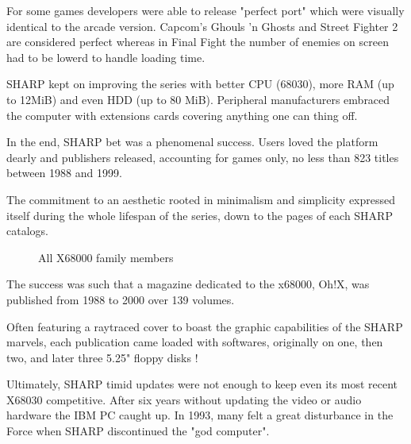  For some games developers were able to release "perfect port" which were visually identical to the arcade version. Capcom's Ghouls 'n Ghosts and Street Fighter 2 are considered perfect whereas in Final Fight the number of enemies on screen had to be lowerd to handle loading time.

 SHARP kept on improving the series with better CPU (68030), more RAM (up to 12MiB) and even HDD (up to 80 MiB). Peripheral manufacturers embraced the computer with extensions cards covering anything one can thing off. 

 In the end, SHARP bet was a phenomenal success. Users loved the platform dearly and publishers released, accounting for games only, no less than 823 titles between 1988 and 1999.



The commitment to an aesthetic rooted in minimalism and simplicity expressed itself during the whole lifespan of the series, down to the pages of each SHARP catalogs. 


 \begin{figure}[H]
\caption*{All X68000 family members}
\end{figure}

\begin{trivia}
The success was such that a magazine dedicated to the x68000, Oh!X, was published from 1988 to 2000 over 139 volumes. 


\begin{minipage}[t]{0.32\linewidth}
\end{minipage}%
\hfill
\begin{minipage}[t]{0.32\linewidth}
\end{minipage}%
\hfill
\begin{minipage}[t]{0.322\linewidth}
\end{minipage}%



Often featuring a raytraced cover to boast the graphic capabilities of the SHARP marvels, each publication came loaded with softwares, originally on one, then two, and later three 5.25" floppy disks \cite{ohXarticle}!
\end{trivia}

Ultimately, SHARP timid updates were not enough to keep even its most recent X68030 competitive. After six years without updating the video or audio hardware the IBM PC caught up. In 1993, many felt a great disturbance in the Force when SHARP discontinued the "god computer".
